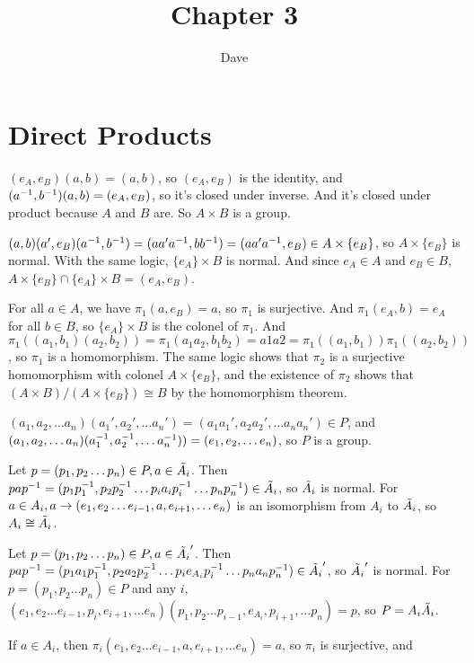 \documentclass[11pt, oneside]{article}   	%
\title{Chapter 3}
\author{Dave}
\begin{document}
\maketitle
\section{Direct Products}
\be
\item $(e_A, e_B)(a, b) = (a, b)$, so $(e_A, e_B)$ is the identity, and $(a^{-1}, b^{-1})(a, b) = (e_A, e_B)$, so it's closed under inverse. And it's closed under product because $A$ and $B$ are. So $A \times B$ is a group.
\item $(a, b)(a', e_B)(a^{-1},b^{-1}) = (aa'a^{-1}, bb^{-1}) = (aa'a^{-1}, e_B) \in A \times \{e_B\}$, so $A \times \{e_B\}$ is normal. With the same logic, $\{e_A\} \times B$ is normal. And since $e_A \in A$ and $e_B \in B$, $A \times \{e_B\} \cap \{e_A\} \times B = (e_A, e_B)$.
\item For all $a \in A$, we have $\pi_1(a, e_B) = a$, so $\pi_1$ is surjective. And $\pi_1(e_A, b) = e_A$ for all $b\in B$, so $\{e_A\} \times B$ is the colonel of $\pi_1$. And $\pi_1((a_1, b_1)(a_2, b_2)) = \pi_1(a_1a_2, b_1b_2) = a1a2 = \pi_1((a_1, b_1))\pi_1((a_2, b_2))$, so $\pi_1$ is a homomorphism. The same logic shows that $\pi_2$ is a surjective homomorphism with colonel $A \times \{e_B\}$, and the existence of $\pi_2$ shows that $(A \times B) / (A \times \{e_B\}) \cong B$ by the homomorphism theorem.
\item $(a_1, a_2, \ldots a_n)(a_1', a_2', \ldots a_n') = (a_1a_1', a_2a_2', \ldots a_na_n') \in P$, and $(a_1, a_2, \ldots a_n)(a_1^{-1}, a_2^{-1}, \ldots a_n^{-1})) = (e_1, e_2, \ldots e_n)$, so $P$ is a group.
\item Let $p = (p_1, p_2 \ldots p_n) \in P, a \in \tilde{A_i}$. Then $pap^{-1} = (p_1p_1^{-1}, p_2p_2^{-1} \ldots p_ia_ip_i^{-1} \ldots p_np_n^{-1}) \in \tilde{A_i}$, so $\tilde{A_i}$ is normal. For $a \in A_i, a \rightarrow (e_1, e_2 \ldots e_{i-1}, a, e_{i+1}, \ldots e_n)$ is an isomorphism from $A_i$ to $\tilde{A_i}$, so $A_i \cong \tilde{A_i}$.
\item Let $p = (p_1, p_2 \ldots p_n) \in P, a \in \tilde{A_i}'$. Then $pap^{-1} = (p_1a_1p_1^{-1}, p_2a_2p_2^{-1} \ldots p_ie_{A_i}p_i^{-1} \ldots p_na_np_n^{-1}) \in \tilde{A_i}'$, so $\tilde{A_i}'$ is normal. For $p = (p_1, p_2 \ldots p_n) \in P$ and any $i$, \\
$(e_1, e_2 \ldots e_{i-1}, p_i, e_{i+1}, \ldots e_n)(p_1, p_2 \ldots p_{i-1}, e_{A_i}, p_{i+1}, \ldots p_n) = p$, so $P = A_i\tilde{A_i}$.
\item If $a \in A_i$, then $\pi_i(e_1, e_2 \ldots e_{i-1}, a, e_{i+1}, \ldots e_n) = a$, so $\pi_i$ is surjective, and \\
\end{document}
